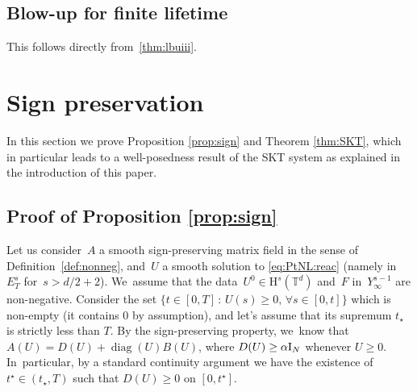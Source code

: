 \documentclass[10pt]{amsart}
\DeclareMathOperator{\diag}{diag}
\theoremstyle{definition}
\newcommand\T{\mathbb{T}}
\renewcommand\H{\mathrm{H}}
\begin{document}
\subsection{Blow-up for finite lifetime}
This follows directly from~\eqref{thm:lbuiii}.

\section{Sign preservation}\label{proofprop:sign}
In this section we prove Proposition \ref{prop:sign} and Theorem \ref{thm:SKT}, which in particular leads to a well-posedness result of the SKT system as explained in the introduction of this paper.
\subsection{Proof of Proposition \ref{prop:sign}}
Let us consider~$A$ a smooth sign-preserving matrix field in the sense of Definition~\ref{def:nonneg}, and~$U$ a smooth solution to \eqref{eq:PtNL:reac} (namely in $E^s_T$ for~$s>d/2+2$). We~assume that the data~$U^0\in\H^s(\T^d)$ and~$F$ in~$Y_\infty^{s-1}$ are non-negative. Consider the set $\{t \in[0,T] \,:\, U(s)\geq 0,\, \forall s\in[0,t]\}$ which is non-empty (it contains $0$ by assumption), and let's assume that its supremum $t_\star$ is strictly less than $T$. By the sign-preserving property, we~know that $A(U) = D(U)+ \diag(U)B(U)$, where $D(U)\geq \alpha \textnormal{I}_N$ whenever $U\geq 0$. In~particular, by a standard continuity argument we have the existence of $t^\star\in (t_\star,T)$ such that $D(U)\geq 0$ on $[0,t^\star]$.
\end{document}
